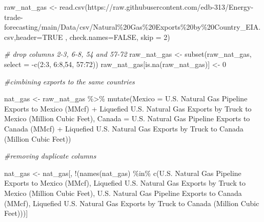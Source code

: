 \documentclass[
]{article}
\newenvironment{Shaded}{\begin{snugshade}}{\end{snugshade}}
\newcommand{\AttributeTok}[1]{\textcolor[rgb]{0.77,0.63,0.00}{#1}}
\newcommand{\CommentTok}[1]{\textcolor[rgb]{0.56,0.35,0.01}{\textit{#1}}}
\newcommand{\ConstantTok}[1]{\textcolor[rgb]{0.00,0.00,0.00}{#1}}
\newcommand{\DecValTok}[1]{\textcolor[rgb]{0.00,0.00,0.81}{#1}}
\newcommand{\FunctionTok}[1]{\textcolor[rgb]{0.00,0.00,0.00}{#1}}
\newcommand{\NormalTok}[1]{#1}
\newcommand{\OtherTok}[1]{\textcolor[rgb]{0.56,0.35,0.01}{#1}}
\newcommand{\SpecialCharTok}[1]{\textcolor[rgb]{0.00,0.00,0.00}{#1}}
\newcommand{\StringTok}[1]{\textcolor[rgb]{0.31,0.60,0.02}{#1}}
\begin{document}
\begin{Shaded}
\begin{Highlighting}[]
\NormalTok{raw\_nat\_gas }\OtherTok{\textless{}{-}} \FunctionTok{read.csv}\NormalTok{(}\StringTok{\textquotesingle{}https://raw.githubusercontent.com/edb{-}313/Energy{-}trade{-}forecasting/main/Data/csv/Natural\%20Gas\%20Exports\%20by\%20Country\_EIA.csv\textquotesingle{}}\NormalTok{,}\AttributeTok{header=}\ConstantTok{TRUE}\NormalTok{ , }\AttributeTok{check.names=}\ConstantTok{FALSE}\NormalTok{, }\AttributeTok{skip =} \DecValTok{2}\NormalTok{)}

\CommentTok{\# drop columns 2{-}3, 6{-}8, 54 and 57{-}72}
\NormalTok{raw\_nat\_gas }\OtherTok{\textless{}{-}} \FunctionTok{subset}\NormalTok{(raw\_nat\_gas, }\AttributeTok{select =} \SpecialCharTok{{-}}\FunctionTok{c}\NormalTok{(}\DecValTok{2}\SpecialCharTok{:}\DecValTok{3}\NormalTok{, }\DecValTok{6}\SpecialCharTok{:}\DecValTok{8}\NormalTok{,}\DecValTok{54}\NormalTok{, }\DecValTok{57}\SpecialCharTok{:}\DecValTok{72}\NormalTok{))}
\NormalTok{raw\_nat\_gas[}\FunctionTok{is.na}\NormalTok{(raw\_nat\_gas)] }\OtherTok{\textless{}{-}} \DecValTok{0}

\CommentTok{\#cimbining exports to the same countries}

\NormalTok{nat\_gas }\OtherTok{\textless{}{-}}\NormalTok{ raw\_nat\_gas }\SpecialCharTok{\%\textgreater{}\%}
  \FunctionTok{mutate}\NormalTok{(}\AttributeTok{Mexico =} \StringTok{\textasciigrave{}}\AttributeTok{U.S. Natural Gas Pipeline Exports to Mexico (MMcf)}\StringTok{\textasciigrave{}} \SpecialCharTok{+} \StringTok{\textasciigrave{}}\AttributeTok{Liquefied U.S. Natural Gas Exports by Truck to Mexico (Million Cubic Feet)}\StringTok{\textasciigrave{}}\NormalTok{,}
         \AttributeTok{Canada =} \StringTok{\textasciigrave{}}\AttributeTok{U.S. Natural Gas Pipeline Exports to Canada (MMcf)}\StringTok{\textasciigrave{}} \SpecialCharTok{+} \StringTok{\textasciigrave{}}\AttributeTok{Liquefied U.S. Natural Gas Exports by Truck to Canada (Million Cubic Feet)}\StringTok{\textasciigrave{}}\NormalTok{)}

\CommentTok{\#removing duplicate columns}

\NormalTok{nat\_gas }\OtherTok{\textless{}{-}}\NormalTok{ nat\_gas[, }\SpecialCharTok{!}\NormalTok{(}\FunctionTok{names}\NormalTok{(nat\_gas) }\SpecialCharTok{\%in\%} \FunctionTok{c}\NormalTok{(}\StringTok{\textquotesingle{}U.S. Natural Gas Pipeline Exports to Mexico (MMcf)\textquotesingle{}}\NormalTok{,}
                                             \StringTok{\textquotesingle{}Liquefied U.S. Natural Gas Exports by Truck to Mexico (Million Cubic Feet)\textquotesingle{}}\NormalTok{,}
                                             \StringTok{\textquotesingle{}U.S. Natural Gas Pipeline Exports to Canada (MMcf)\textquotesingle{}}\NormalTok{,}
                                             \StringTok{\textquotesingle{}Liquefied U.S. Natural Gas Exports by Truck to Canada (Million Cubic Feet)\textquotesingle{}}\NormalTok{))]}


\end{Highlighting}
\end{Shaded}
\end{document}
